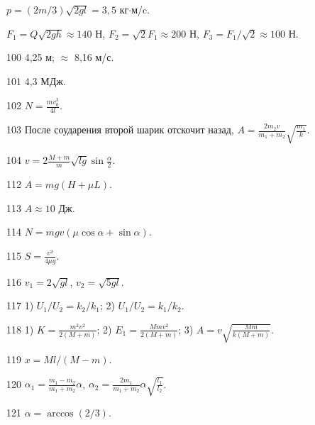 \begin{Answer}{98}
$p = (2m/3)\sqrt{2gl} = 3,5$ кг$\cdot$м/c.
\end{Answer}
\begin{Answer}{99}
$F_1 = Q\sqrt{2gh} \approx 140$ Н, $F_2 = \sqrt{2} F_1 \approx 200$ Н, $F_3 = F_1/\sqrt{2} \approx 100$ Н.
\end{Answer}
\begin{Answer}{100}
4,25 м; $\approx$ 8,16 м/с.
\end{Answer}
\begin{Answer}{101}
4,3 МДж.
\end{Answer}
\begin{Answer}{102}
$N =\frac{mv_{0}^3}{4l}$.
\end{Answer}
\begin{Answer}{103}
После соударения второй шарик отскочит назад, $A = \frac{2m_2v}{m_1+m_2}\sqrt{\frac{m_1}{k}}$.
\end{Answer}
\begin{Answer}{104}
$v = 2\frac{M+m}{m}\sqrt{lg}\sin \frac{\alpha}{2}$.
\end{Answer}
\begin{Answer}{112}
$A=mg(H+\mu L)$.
\end{Answer}
\begin{Answer}{113}
$A \approx 10$ Дж.
\end{Answer}
\begin{Answer}{114}
$N = mgv(\mu \cos \alpha +\sin \alpha)$.
\end{Answer}
\begin{Answer}{115}
$S = \frac{v^2}{4 \mu g}$.
\end{Answer}
\begin{Answer}{116}
$v_1 = 2\sqrt{gl}$, $v_2 = \sqrt{5gl}$.
\end{Answer}
\begin{Answer}{117}
1) $U_1/U_2 = k_2/k_1$; 2) $U_1/U_2 = k_1/k_2$.
\end{Answer}
\begin{Answer}{118}
1) $K=\frac{m^2v^2}{2(M+m)}$; 2) $E_1 = \frac{Mmv^2}{2(M+m)}$; 3) $A = v\sqrt{\frac{Mm}{k(M+m)}}$.
\end{Answer}
\begin{Answer}{119}
$x = Ml/(M-m)$.
\end{Answer}
\begin{Answer}{120}
$\alpha_1 =\frac{m_1-m_2}{m_1+m_2}\alpha$, $\alpha_2 =\frac{2m_1}{m_1+m_2}\alpha \sqrt{\frac{l_1}{l_2}}$.
\end{Answer}
\begin{Answer}{121}
$\alpha = \arccos(2/3)$.
\end{Answer}
